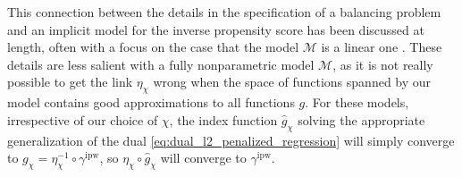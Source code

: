 \documentclass{article}
\DeclareMathOperator*{\argmin}{argmin}
\theoremstyle{definition}
\newcommand{\ipw}{\text{ipw}}
\newcommand{\dispersion}{\chi}
\newcommand{\hgamma}{\ensuremath{\hat\gamma}}
\newcommand{\gammaipw}{\ensuremath{\gamma^{\ipw}}}
\newcommand{\model}{\mathcal{M}}
\newcommand{\<}{\langle}
\renewcommand{\>}{\rangle}
\begin{document}
This connection between the details in the specification of a balancing problem and
an implicit model for the inverse propensity score has been discussed at length,
often with a focus on the case that the model $\model$ is a linear one \citep[e.g.,][]{zhao2019covariate}.
These details are less salient with a fully nonparametric model $\model$, as it is not really possible to
get the link $\eta_{\dispersion}$ wrong when the space of functions spanned by our model contains good approximations to all functions $g$. For these models, irrespective of our choice of $\chi$,
the index function $\hat g_\chi$ solving the appropriate generalization of the dual \eqref{eq:dual_l2_penalized_regression} will simply
converge to $g_\chi = \eta_{\chi}^{-1} \circ \gammaipw$, so
$\eta_\chi \circ \hat g_\chi$ will converge to $\gammaipw$.%



\end{document}
